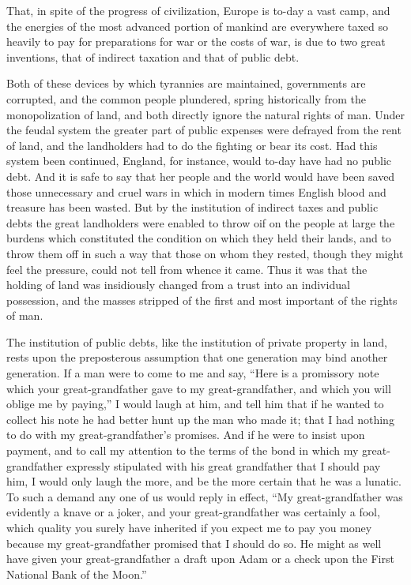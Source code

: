 \documentclass{book}
\begin{document}
That, in spite of the progress of civilization, Europe is to-day a vast camp, and the energies of the most advanced portion of mankind are everywhere taxed so heavily to pay for preparations for war or the costs of war, is due to two great inventions, that of indirect taxation and that of public debt.

Both of these devices by which tyrannies are maintained, governments are corrupted, and the common people plundered, spring historically from the monopolization of land, and both directly ignore the natural rights of man. Under the feudal system the greater part of public expenses were defrayed from the rent of land, and the landholders had to do the fighting or bear its cost. Had this system been continued, England, for instance, would to-day have had no public debt. And it is safe to say that her people and the world would have been saved those unnecessary and cruel wars in which in modern times English blood and treasure has been wasted. But by the institution of indirect taxes and public debts the great landholders were enabled to throw oif on the people at large the burdens which constituted the condition on which they held their lands, and to throw them off in such a way that those on whom they rested, though they might feel the pressure, could not tell from whence it came. Thus it was that the holding of land was insidiously changed from a trust into an individual possession, and the masses stripped of the first and most important of the rights of man.

The institution of public debts, like the institution of private property in land, rests upon the preposterous assumption that one generation may bind another generation. If a man were to come to me and say, “Here is a promissory note which your great-grandfather gave to my great-grandfather, and which you will oblige me by paying,” I would laugh at him, and tell him that if he wanted to collect his note he had better hunt up the man who made it; that I had nothing to do with my great-grandfather’s promises. And if he were to insist upon payment, and to call my attention to the terms of the bond in which my great-grandfather expressly stipulated with his great grandfather that I should pay him, I would only laugh the more, and be the more certain that he was a lunatic. To such a demand any one of us would reply in effect, “My great-grandfather was evidently a knave or a joker, and your great-grandfather was certainly a fool, which quality you surely have inherited if you expect me to pay you money because my great-grandfather promised that I should do so. He might as well have given your great-grandfather a draft upon Adam or a check upon the First National Bank of the Moon.”
\end{document}
